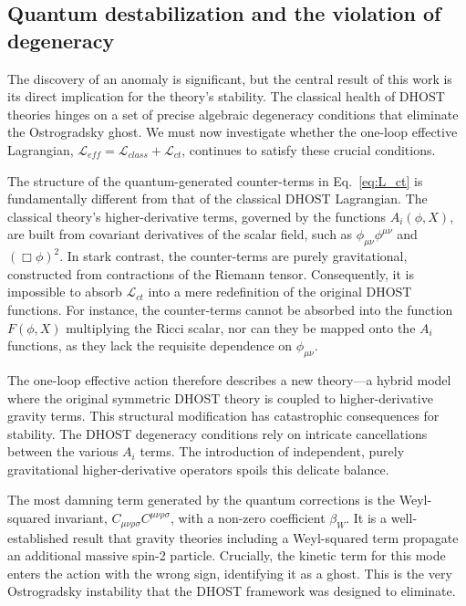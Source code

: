 \documentclass[twocolumn]{aastex631}
\begin{document}
\subsection{Quantum destabilization and the violation of degeneracy}
The discovery of an anomaly is significant, but the central result of this work is its direct implication for the theory's stability. The classical health of DHOST theories hinges on a set of precise algebraic degeneracy conditions that eliminate the Ostrogradsky ghost. We must now investigate whether the one-loop effective Lagrangian, $\mathcal{L}_{eff} = \mathcal{L}_{class} + \mathcal{L}_{ct}$, continues to satisfy these crucial conditions.

The structure of the quantum-generated counter-terms in Eq.~\eqref{eq:L_ct} is fundamentally different from that of the classical DHOST Lagrangian. The classical theory's higher-derivative terms, governed by the functions $A_i(\phi, X)$, are built from covariant derivatives of the scalar field, such as $\phi_{\mu\nu}\phi^{\mu\nu}$ and $(\Box\phi)^2$. In stark contrast, the counter-terms are purely gravitational, constructed from contractions of the Riemann tensor. Consequently, it is impossible to absorb $\mathcal{L}_{ct}$ into a mere redefinition of the original DHOST functions. For instance, the counter-terms cannot be absorbed into the function $F(\phi, X)$ multiplying the Ricci scalar, nor can they be mapped onto the $A_i$ functions, as they lack the requisite dependence on $\phi_{\mu\nu}$.

The one-loop effective action therefore describes a new theory---a hybrid model where the original symmetric DHOST theory is coupled to higher-derivative gravity terms. This structural modification has catastrophic consequences for stability. The DHOST degeneracy conditions rely on intricate cancellations between the various $A_i$ terms. The introduction of independent, purely gravitational higher-derivative operators spoils this delicate balance.

The most damning term generated by the quantum corrections is the Weyl-squared invariant, $C_{\mu\nu\rho\sigma}C^{\mu\nu\rho\sigma}$, with a non-zero coefficient $\beta_W$. It is a well-established result that gravity theories including a Weyl-squared term propagate an additional massive spin-2 particle. Crucially, the kinetic term for this mode enters the action with the wrong sign, identifying it as a ghost. This is the very Ostrogradsky instability that the DHOST framework was designed to eliminate.
\end{document}
